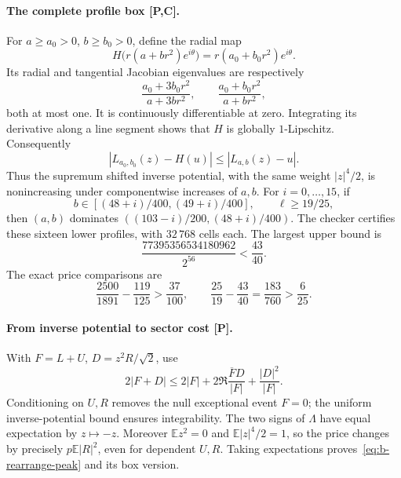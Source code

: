 \paragraph{The complete profile box [P,C].}
For \(a\geq a_0>0\), \(b\geq b_0>0\), define the radial map
\[
 H\bigl(r(a+br^2)e^{i\theta}\bigr)
       =r(a_0+b_0r^2)e^{i\theta}.
\]
Its radial and tangential Jacobian eigenvalues are respectively
\[
 \frac{a_0+3b_0r^2}{a+3br^2},\qquad
 \frac{a_0+b_0r^2}{a+br^2},
\]
both at most one.  It is continuously differentiable at zero.  Integrating
its derivative along a line segment shows that \(H\) is globally
\(1\)-Lipschitz.  Consequently
\[
 |L_{a_0,b_0}(z)-H(u)|\leq|L_{a,b}(z)-u|.
\]
Thus the supremum shifted inverse potential, with the same weight
\(|z|^4/2\), is nonincreasing under componentwise increases of \(a,b\).
For \(i=0,\ldots,15\), if
\[
 b\in[(48+i)/400,(49+i)/400],\qquad \ell\geq19/25,
\]
then \((a,b)\) dominates \(((103-i)/200,(48+i)/400)\).
The checker certifies these sixteen lower profiles, with \(32\,768\)
cells each.  The largest upper bound is
\[
 \frac{77395356534180962}{2^{56}}<\frac{43}{40}.
\]
The exact price comparisons are
\[
 \frac{2500}{1891}-\frac{119}{125}>\frac{37}{100},
 \qquad
 \frac{25}{19}-\frac{43}{40}
    =\frac{183}{760}>\frac6{25}.
\]

\paragraph{From inverse potential to sector cost [P].}
With \(F=L+U\), \(D=z^2R/\sqrt2\), use
\[
 2|F+D|\leq 2|F|
       +2\Re\frac{\overline F D}{|F|}
       +\frac{|D|^2}{|F|}.
\]
Conditioning on \(U,R\) removes the null exceptional event \(F=0\);
the uniform inverse-potential bound ensures integrability.  The two
signs of \(\Lambda\) have equal expectation by \(z\mapsto-z\).
Moreover \(\mathbb Ez^2=0\) and \(\mathbb E|z|^4/2=1\), so the price
changes by precisely \(p\mathbb E|R|^2\), even for dependent \(U,R\).
Taking expectations proves~\eqref{eq:b-rearrange-peak} and its box version.

